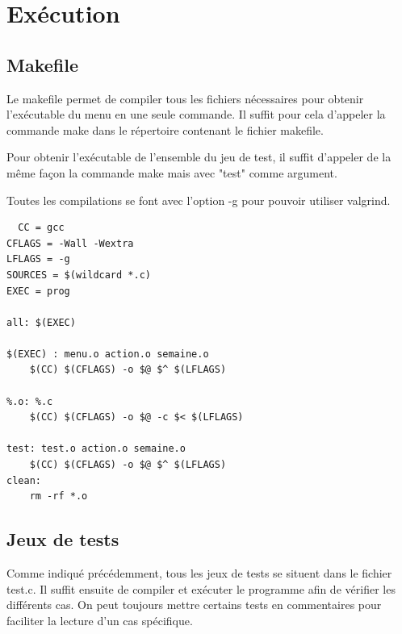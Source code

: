 \documentclass[11pt]{article}
\begin{document}
\section{Exécution}
\label{sec:orgfe68f22}

\subsection{Makefile}
\label{sec:org4d45448}

Le makefile permet de compiler tous les fichiers nécessaires pour obtenir l'exécutable du
menu en une seule commande. Il suffit pour cela d'appeler la commande make
dans le répertoire contenant le fichier makefile.

Pour obtenir l'exécutable de l'ensemble du jeu de test, il suffit d'appeler de la même façon la commande make mais avec "test" comme argument.

Toutes les compilations se font avec l'option -g pour pouvoir utiliser valgrind.

\begin{verbatim}
  CC = gcc
CFLAGS = -Wall -Wextra
LFLAGS = -g
SOURCES = $(wildcard *.c)
EXEC = prog

all: $(EXEC)

$(EXEC) : menu.o action.o semaine.o
	$(CC) $(CFLAGS) -o $@ $^ $(LFLAGS)

%.o: %.c
	$(CC) $(CFLAGS) -o $@ -c $< $(LFLAGS)

test: test.o action.o semaine.o
	$(CC) $(CFLAGS) -o $@ $^ $(LFLAGS)	
clean: 
	rm -rf *.o

\end{verbatim}


\subsection{Jeux de tests}
\label{sec:org59e5ee5}

Comme indiqué précédemment, tous les jeux de tests se situent dans le fichier
test.c. Il suffit ensuite de compiler et exécuter le programme afin de
vérifier les différents cas. On peut toujours mettre certains tests en
commentaires pour faciliter la lecture d'un cas spécifique.
\end{document}
